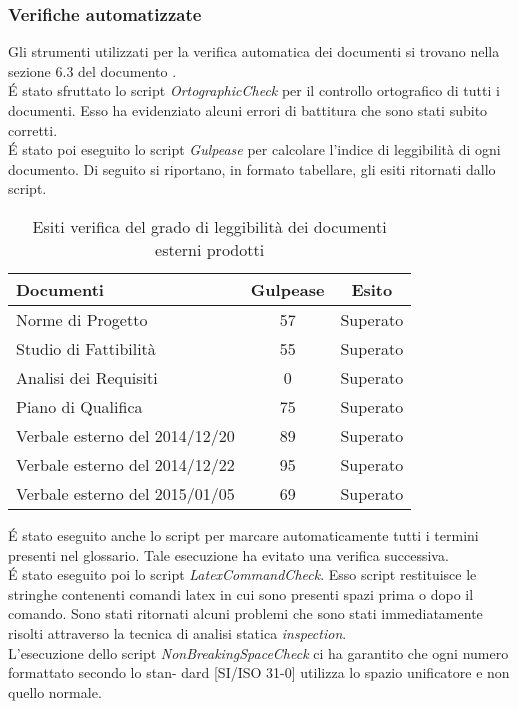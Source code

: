 			\subsubsection{Verifiche automatizzate}
				Gli strumenti utilizzati per la verifica automatica dei documenti si trovano nella sezione 6.3 del documento .\\
				É stato sfruttato lo script \textit{OrtographicCheck} per  il controllo ortografico di tutti i documenti. Esso ha evidenziato alcuni errori di battitura che sono stati subito corretti.\\
				É stato poi eseguito lo script \textit{Gulpease} per calcolare l'indice di leggibilità di ogni documento. Di seguito si riportano, in formato tabellare, gli esiti ritornati dallo script.
				\begin{table}[H]\centering
						\begin{tabu}{| l | c | c |}
							\hline
							Documenti 				& Gulpease	& Esito  \\ \hline
							
							Norme di Progetto 			& 57		& Superato 		 \\
							Studio di Fattibilità 			& 55		& Superato 		 \\
							Analisi dei Requisiti	 			& 0		& Superato 		 \\
							Piano di Qualifica 			& 75		& Superato 	 \\
							Verbale esterno del 2014/12/20 			& 89 		& Superato	\\
							Verbale esterno del 2014/12/22	 	& 95		& Superato 	\\ 
							Verbale esterno del 2015/01/05	& 69		& Superato\\ \hline 
						\end{tabu}
					\caption{Esiti verifica del grado di leggibilità dei documenti esterni prodotti}
				\end{table}
				É stato eseguito anche lo script per marcare automaticamente tutti i termini presenti nel glossario. Tale esecuzione ha evitato una verifica successiva.\\
				É stato eseguito poi lo script \textit{LatexCommandCheck}. Esso script restituisce le stringhe contenenti comandi latex in cui sono presenti spazi prima o dopo il comando. Sono stati ritornati alcuni problemi che sono stati immediatamente risolti attraverso la tecnica di analisi statica \textit{inspection}.\\
				L'esecuzione dello script \textit{NonBreakingSpaceCheck} ci ha garantito che ogni numero formattato secondo lo stan- dard [SI/ISO 31-0] utilizza lo spazio unificatore e non quello normale.
